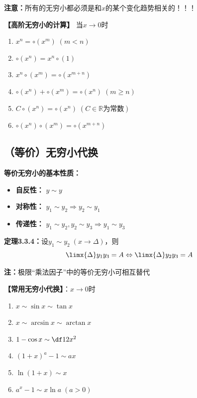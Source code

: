 {\bf 注意：}所有的无穷小都必须是和$x$的某个变化趋势相关的！！！

\begin{shaded}
	{\bf 【高阶无穷小的计算】}
	当$x\to 0$时
	\begin{enumerate}[(1)]
  	  \setlength{\itemindent}{1cm}
	  \item $x^n=\circ(x^m)\;(m<n)$ 
	  \item $\circ(x^n)=x^n\circ(1)$ 
	  \item $x^n\circ(x^m)=\circ(x^{m+n})$ 
	  \item $\circ(x^n)+\circ(x^m)=\circ(x^n)\;(m\geq n)$ 
	  \item $C\circ(x^n)=\circ(x^n)\;(C\in\mathbb{R}\mbox{为常数})$ 
	  \item $\circ(x^n)\circ(x^m)=\circ(x^{m+n})$
	\end{enumerate}
\end{shaded}

\subsection{（等价）无穷小代换}

{\bf 等价无穷小的基本性质：}
\begin{itemize}
  \setlength{\itemindent}{1cm}
  \item {\bf 自反性：} $y\sim y$ 
  \item {\bf 对称性：} $y_1\sim y_2\Rightarrow y_2\sim y_1$ 
  \item {\bf 传递性：} $y_1\sim y_2,y_2\sim y_3\Rightarrow y_1\sim y_3$ 
\end{itemize}

{\bf 定理3.3.4：}设$y_1\sim y_2\;(x\to\Delta)$，则
$$\limx{\Delta}y_1y_3=A\Leftrightarrow\limx{\Delta}y_2y_3=A$$

{\bf 注：}极限“乘法因子”中的等价无穷小可相互替代

{\bf 【常用无穷小代换】}：$x\to 0$时
\begin{enumerate}[(1)]
  \setlength{\itemindent}{1cm}
  \item $x\sim \sin x\sim \tan x$ 
  \item $x \sim\arcsin x\sim\arctan x$ 
  \item $1-\cos x\sim \df 12 x^2$ 
  \item $(1+x)^a-1\sim ax$ 
  \item $\ln(1+x)\sim x$ 
  \item $a^x-1\sim x\ln a\;(a>0)$
\end{enumerate}

